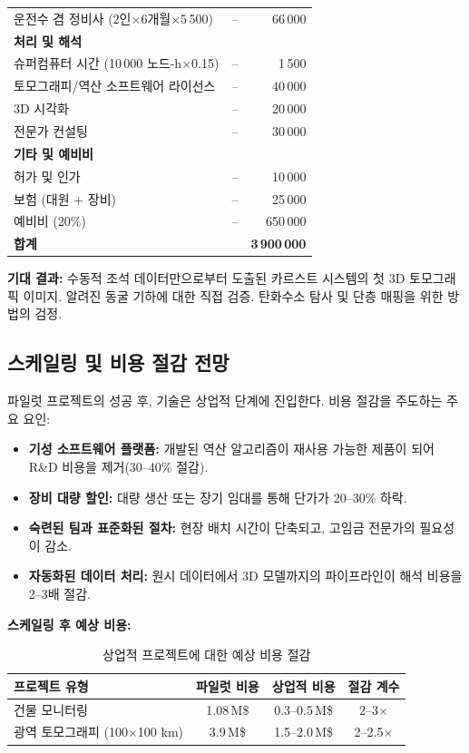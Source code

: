 \documentclass[12pt,a4paper]{article}
\theoremstyle{remark}
\begin{document}
\begin{table}[htbp]
\begin{tabular}{lrr}
			운전수 겸 정비사 (2인$\times$6개월$\times$5\,500) & – & 66\,000 \\
			\multicolumn{3}{l}{\textbf{처리 및 해석}} \\
			슈퍼컴퓨터 시간 (10\,000 노드-h$\times$0.15) & – & 1\,500 \\
			토모그래피/역산 소프트웨어 라이선스 & – & 40\,000 \\
			3D 시각화 & – & 20\,000 \\
			전문가 컨설팅 & – & 30\,000 \\
			\multicolumn{3}{l}{\textbf{기타 및 예비비}} \\
			허가 및 인가 & – & 10\,000 \\
			보험 (대원 + 장비) & – & 25\,000 \\
			예비비 (20\%) & – & 650\,000 \\
			\midrule
			\textbf{합계} & & \textbf{3\,900\,000} \\
			\bottomrule
		\end{tabular}
	\end{table}
	
	\textbf{기대 결과:} 수동적 조석 데이터만으로부터 도출된 카르스트 시스템의 첫 3D 토모그래픽 이미지. 알려진 동굴 기하에 대한 직접 검증. 탄화수소 탐사 및 단층 매핑을 위한 방법의 검정.
	
	\subsection{스케일링 및 비용 절감 전망}
	
	파일럿 프로젝트의 성공 후, 기술은 상업적 단계에 진입한다. 비용 절감을 주도하는 주요 요인:
	
	\begin{itemize}
		\item \textbf{기성 소프트웨어 플랫폼:} 개발된 역산 알고리즘이 재사용 가능한 제품이 되어 R\&D 비용을 제거(30–40\% 절감).
		\item \textbf{장비 대량 할인:} 대량 생산 또는 장기 임대를 통해 단가가 20–30\% 하락.
		\item \textbf{숙련된 팀과 표준화된 절차:} 현장 배치 시간이 단축되고, 고임금 전문가의 필요성이 감소.
		\item \textbf{자동화된 데이터 처리:} 원시 데이터에서 3D 모델까지의 파이프라인이 해석 비용을 2–3배 절감.
	\end{itemize}
	
	\textbf{스케일링 후 예상 비용:}
	
	\begin{table}[htbp]
		\centering
		\caption{상업적 프로젝트에 대한 예상 비용 절감}
		\label{tab:scaling}
		\begin{tabular}{lccc}
			\toprule
			\textbf{프로젝트 유형} & \textbf{파일럿 비용} & \textbf{상업적 비용} & \textbf{절감 계수} \\
			\midrule
			건물 모니터링 & 1.08\,M\$ & 0.3–0.5\,M\$ & 2–3× \\
			광역 토모그래피 (100×100 km) & 3.9\,M\$ & 1.5–2.0\,M\$ & 2–2.5× \\
			\bottomrule
		\end{tabular}
	\end{table}
	
\end{document}
